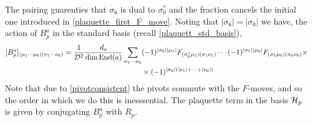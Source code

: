 The pairing guarenties that $\sigma_6$ is dual to $\sigma_0^*$ and the fraction cancels the initial one introduced in \eqref{plaquette_first_F_move}.
Noting that $|\sigma_6| = |\sigma_0|$ we have, the action of $B_p^a$ in the standard basis (recall \eqref{plaquett_std_basis}),
\begin{align}
\nonumber
[B_p^a]_{(\mu_1 \cdots \mu_6)(\nu_1 \cdots \nu_6)} =  \frac{1}{\mathcal{D}^2} \frac{d_a}{\dim \text{End}(a)} \sum_{\sigma_1 \cdots \sigma_6} &
(-1)^{|\sigma_6| |\mu_1|}F_{(\sigma_6^* \mu_1)(\sigma_1 \nu_1)}  \cdots 
(-1)^{|\sigma_5| |\mu_6|}F_{(\sigma_5 \mu_6)(\sigma_6 \nu_6)} \times \\
& \times (-1)^{|\sigma_6| (|\nu_1| + \cdots+ |\nu_6|)}
\label{plaquettematrix}
\end{align} 
Note that due to \eqref{pivotconsistent} the pivots commute with the $F$-moves, 
and so the order in which we do this is inesssential.
The plaquette term in the basis $\mathcal{H}_p$ is given by conjugating $B_p^a$ with $R_p$.




